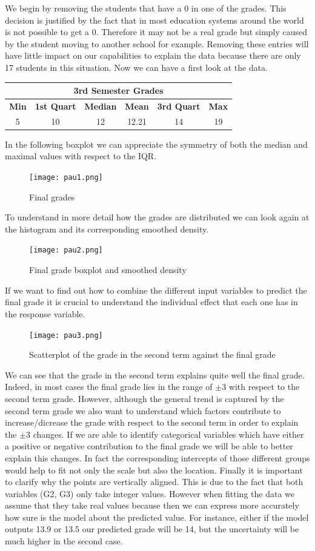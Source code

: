 \documentclass[a4paper, 11pt]{report}
\theoremstyle{definition}
\numberwithin{equation}{section}		%
\numberwithin{table}{section}				%
\begin{document}
We begin by removing the students that have a 0 in one of the grades. This decision is justified by the fact that in most education systems around the world is not possible to get a 0. Therefore it may not be a real grade but simply caused by the student moving to another school for example.  Removing these entries will have little impact on our capabilities to explain the data because there are only 17 students in this situation. Now we can have a first look at the data.\bigskip
\begin{center}
\begin{tabular}{ |c|c|c|c|c|c|  }
 \hline
 \multicolumn{6}{|c|}{3rd Semester Grades} \\
 \hline
\textbf{Min} & \textbf{1st Quart} & \textbf{Median} & \textbf{Mean} &  \textbf{3rd Quart} & \textbf{Max}\\
\hline
 5   & 10   & 12 &  12.21 &14&   19\\
 \hline
\end{tabular}
\end{center}
\bigskip In the following boxplot we can appreciate the symmetry of both the median and maximal values with respect to the IQR.
\begin{figure}[h]\centering
\texttt{[image: pau1.png]}
\caption{Final grades}
\end{figure}
\newpage
To understand in more detail how the grades are distributed we can look again at the histogram and  its corresponding smoothed density. \bigskip
\begin{figure}[h]\centering
\texttt{[image: pau2.png]}
\caption{Final grade boxplot and smoothed density}
\end{figure}
If we want to find out how to combine the different input variables to predict the final grade it is crucial to understand the individual effect that each one has in the response variable.
\begin{figure}[h]\centering
\texttt{[image: pau3.png]}
\caption{Scatterplot of the grade in the second term against the final grade}
\end{figure}
\newline
We can see that the grade in the second term explains quite well the final grade. Indeed, in most cases the final grade lies in the range of $\pm 3$ with respect to the second term grade. However, although the general trend is captured by the second term grade we also want to understand which factors contribute to increase/dicrease the grade with respect to the second term in order to explain the $\pm 3$ changes. If we are able to identify categorical variables which have either a positive or negative contribution to the final grade we will be able to better explain this changes. In fact the corresponding intercepts of those different groups would help to fit not only the scale but also the location.
Finally it is important to clarify why the points are vertically aligned. This is due to the fact that both variables (G2, G3) only take integer values. However when fitting the data we assume that they take real values because then we can express more accurately how sure is the model about the predicted value. For instance, either if the model outputs 13.9 or 13.5 our predicted grade will be 14, but the uncertainty will be much higher in the second case.\bigskip
\end{document}
